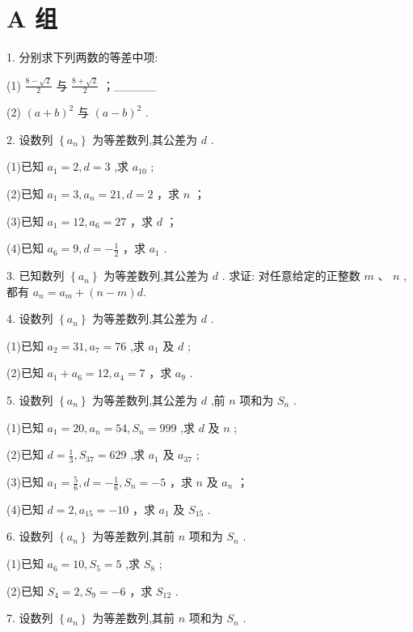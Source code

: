 \documentclass[10pt]{article}
\begin{document}
\section*{A 组}

1. 分别求下列两数的等差中项:

(1) \(\frac{8 - \sqrt{2}}{2}\) 与 \(\frac{8 + \sqrt{2}}{2}\) ；\_\_\_\_\_

(2) \({\left( a + b\right) }^{2}\) 与 \({\left( a - b\right) }^{2}\) .

2. 设数列 \(\left\{  {a}_{n}\right\}\) 为等差数列,其公差为 \(d\) .

(1)已知 \({a}_{1} = 2,d = 3\) ,求 \({a}_{10}\) ;

(2)已知 \({a}_{1} = 3,{a}_{n} = {21},d = 2\) ，求 \(n\) ；

(3)已知 \({a}_{1} = {12},{a}_{6} = {27}\) ，求 \(d\) ；

(4)已知 \({a}_{6} = 9,d =  - \frac{1}{2}\) ，求 \({a}_{1}\) .

3. 已知数列 \(\left\{  {a}_{n}\right\}\) 为等差数列,其公差为 \(d\) . 求证: 对任意给定的正整数 \(m\text{ 、 }n\) ,都有 \({a}_{n} = {a}_{m} + \left( {n - m}\right) d.\)

4. 设数列 \(\left\{  {a}_{n}\right\}\) 为等差数列,其公差为 \(d\) .

(1)已知 \({a}_{2} = {31},{a}_{7} = {76}\) ,求 \({a}_{1}\) 及 \(d\) ;

(2)已知 \({a}_{1} + {a}_{6} = {12},{a}_{4} = 7\) ，求 \({a}_{9}\) .

5. 设数列 \(\left\{  {a}_{n}\right\}\) 为等差数列,其公差为 \(d\) ,前 \(n\) 项和为 \({S}_{n}\) .

(1)已知 \({a}_{1} = {20},{a}_{n} = {54},{S}_{n} = {999}\) ,求 \(d\) 及 \(n\) ;

(2)已知 \(d = \frac{1}{3},{S}_{37} = {629}\) ,求 \({a}_{1}\) 及 \({a}_{37}\) ;

(3)已知 \({a}_{1} = \frac{5}{6},d =  - \frac{1}{6},{S}_{n} =  - 5\) ，求 \(n\) 及 \({a}_{n}\) ；

(4)已知 \(d = 2,{a}_{15} =  - {10}\) ，求 \({a}_{1}\) 及 \({S}_{15}\) .

6. 设数列 \(\left\{  {a}_{n}\right\}\) 为等差数列,其前 \(n\) 项和为 \({S}_{n}\) .

(1)已知 \({a}_{6} = {10},{S}_{5} = 5\) ,求 \({S}_{8}\) ;

(2)已知 \({S}_{4} = 2,{S}_{9} =  - 6\) ，求 \({S}_{12}\) .

7. 设数列 \(\left\{  {a}_{n}\right\}\) 为等差数列,其前 \(n\) 项和为 \({S}_{n}\) .
\end{document}
